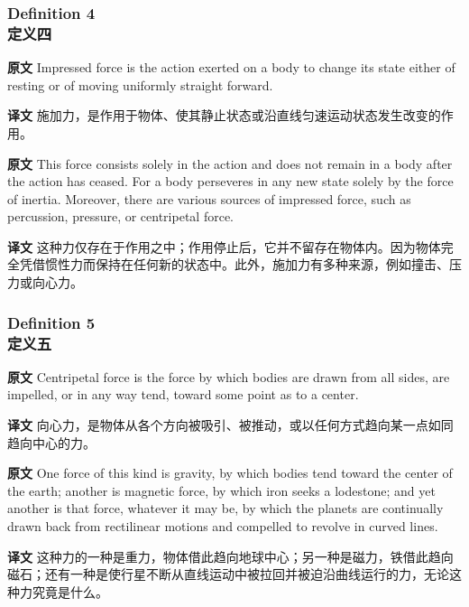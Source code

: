 \documentclass[UTF8,zihao=-4]{ctexart}
\begin{document}
\subsubsection*{Definition 4\\定义四}
\noindent\textbf{原文} Impressed force is the action exerted on a body to change its state either of resting or of moving uniformly straight forward.
\par\noindent\textbf{译文} 施加力，是作用于物体、使其静止状态或沿直线匀速运动状态发生改变的作用。
\medskip

\noindent\textbf{原文} This force consists solely in the action and does not remain in a body after the action has ceased. For a body perseveres in any new state solely by the force of inertia. Moreover, there are various sources of impressed force, such as percussion, pressure, or centripetal force.
\par\noindent\textbf{译文} 这种力仅存在于作用之中；作用停止后，它并不留存在物体内。因为物体完全凭借惯性力而保持在任何新的状态中。此外，施加力有多种来源，例如撞击、压力或向心力。
\medskip

\subsubsection*{Definition 5\\定义五}
\noindent\textbf{原文} Centripetal force is the force by which bodies are drawn from all sides, are impelled, or in any way tend, toward some point as to a center.
\par\noindent\textbf{译文} 向心力，是物体从各个方向被吸引、被推动，或以任何方式趋向某一点如同趋向中心的力。
\medskip

\noindent\textbf{原文} One force of this kind is gravity, by which bodies tend toward the center of the earth; another is magnetic force, by which iron seeks a lodestone; and yet another is that force, whatever it may be, by which the planets are continually drawn back from rectilinear motions and compelled to revolve in curved lines.
\par\noindent\textbf{译文} 这种力的一种是重力，物体借此趋向地球中心；另一种是磁力，铁借此趋向磁石；还有一种是使行星不断从直线运动中被拉回并被迫沿曲线运行的力，无论这种力究竟是什么。
\medskip
\end{document}
